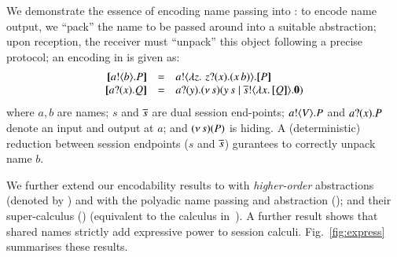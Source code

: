 We demonstrate the essence of encoding name passing into \HO: 
to encode name output, we ``pack''
the name to be passed around into a suitable abstraction; 
upon reception, the receiver must ``unpack'' this object following a precise protocol; an encoding in \HO is given as:
\[
\begin{array}{rcll}
  \map{\bout{a}{b} P}	&=&	\bout{a}{ \abs{z}{\,\binp{z}{x} (\appl{x}{b})} } \map{P} \\
  \map{\binp{a}{x} Q}	&=&	\binp{a}{y} \newsp{s}{\appl{y}{s} \Par \bout{\dual{s}}{\abs{x}{\map{Q}}} \inact}
\end{array}
\]
where $a,b$ are names; $s$ and $\overline{s}$ are 
dual session end-points;
$a ! \langle V \rangle . P$ and 
$a ? (x) . P$ denote an input and output at $a$;   
and $(\nu\, s)(P)$ is hiding. 
A (deterministic) reduction between session endpoints 
($s$ and $\overline{s}$) gurantees to correctly unpack name $b$.

We further extend our encodability results to 
\HOp with \emph{higher-order} abstractions (denoted by \HOpp) 
and \HOp with the polyadic name passing and abstraction (\pHOp); and 
their super-calculus  (\PHOpp) (equivalent to the calculus in~\cite{tlca07}). 
A further result shows that 
shared names
strictly add expressive power 
to session calculi. 
Fig.~\ref{fig:express} summarises %
these results. %

